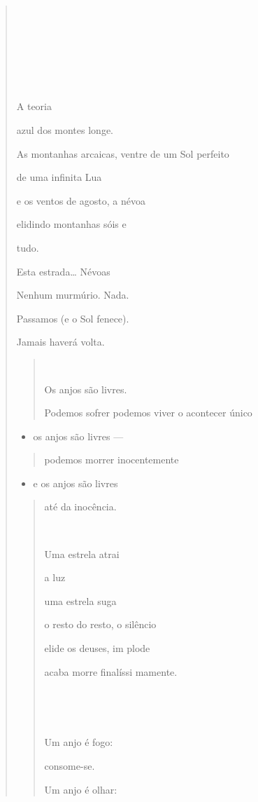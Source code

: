\begin{verse}






  

A teoria

azul dos montes longe.

As montanhas arcaicas, ventre de um Sol perfeito

de uma infinita Lua

e os ventos de agosto, a névoa

elidindo montanhas sóis e

tudo.

Esta estrada\ldots{} Névoas

Nenhum murmúrio. Nada.

Passamos (e o Sol fenece).

Jamais haverá volta.

\begin{quote}


Os anjos são livres.

Podemos sofrer podemos viver o acontecer único
\end{quote}

\begin{itemize}
\item
  os anjos são livres ---
\end{itemize}

\begin{quote}
podemos morrer inocentemente
\end{quote}

\begin{itemize}
\item
  e os anjos são livres
\end{itemize}

\begin{quote}
até da inocência.



Uma estrela atrai

a luz

uma estrela suga

o resto do resto, o silêncio

elide os deuses, im plode

acaba morre finalíssi mamente.





Um anjo é fogo:

consome-se.

Um anjo é olhar:


\end{quote}
\end{verse}
